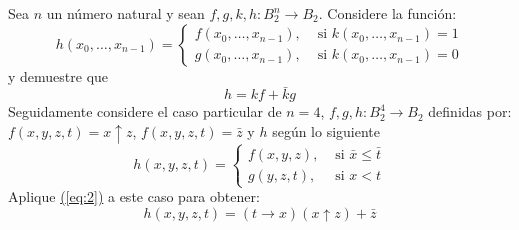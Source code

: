\begin{exercise}
  Sea $n$ un número natural y sean
  $f,g,k,h\colon B_{2}^{n}\longrightarrow B_{2}$. Considere la
  función:
  \begin{equation*}
    h(x_{0},\ldots,x_{n-1})=
    \begin{cases}
      f(x_{0},\ldots,x_{n-1}),&\text{ si } k(x_{0},\ldots,x_{n-1})=1\\
      g(x_{0},\ldots,x_{n-1}),&\text{ si } k(x_{0},\ldots,x_{n-1})=0
    \end{cases}
  \end{equation*}
  y demuestre que 
  \begin{equation}
    \label{eq:2}
    h=kf+\bar{k}g
  \end{equation}
  Seguidamente considere el caso
  particular de $n=4$, $f,g,h\colon B_{2}^{4}\longrightarrow B_{2}$
  definidas por: $f(x,y,z,t)=x\uparrow z$, $f(x,y,z,t)=\bar{z}$ y $h$
  según lo siguiente
  \begin{equation*}
    h(x,y,z,t)=
    \begin{cases}
      f(x,y,z),& \text{ si }\bar{x}\leq\bar{t}\\
      g(y,z,t),& \text{ si }x<t 
    \end{cases}
  \end{equation*}
  Aplique \hyperref[eq:2]{(\ref*{eq:2})} a este caso para obtener:
  \begin{equation}
    \label{eq:3}
    h(x,y,z,t)=(t\to x)(x\uparrow z)+\bar{z}
  \end{equation}
  \end{exercise}

